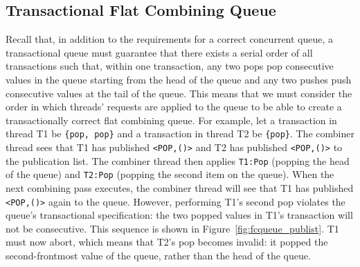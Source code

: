 \subsection{Transactional Flat Combining Queue} 
\label{fcqueuet}

Recall that, in addition to the requirements for a correct concurrent queue, a transactional queue must guarantee that there exists a serial order of all transactions such that, within one transaction, any two pops pop consecutive values in the queue starting from the head of the queue and any two pushes push consecutive values at the tail of the queue.
This means that we must consider the order in which threads' requests are applied to the queue to be able to create a transactionally correct flat combining queue. For example, let a transaction in thread T1 be \texttt{\{pop, pop\}} and a transaction in thread T2 be \texttt{\{pop\}}. The combiner thread sees that T1 has published \texttt{<POP,()>} and T2 has published \texttt{<POP,()>} to the publication list. The combiner thread then applies \texttt{T1:Pop} (popping the head of the queue) and \texttt{T2:Pop} (popping the second item on the queue). When the next combining pass executes, the combiner thread will see that T1 has published \texttt{<POP,()>} again to the queue. However, performing T1's second pop violates the queue's transactional specification: the two popped values in T1's transaction will not be consecutive. This sequence is shown in Figure~\ref{fig:fcqueue_publist}. T1 must now abort, which means that T2's pop becomes invalid: it popped the second-frontmost value of the queue, rather than the head of the queue.

